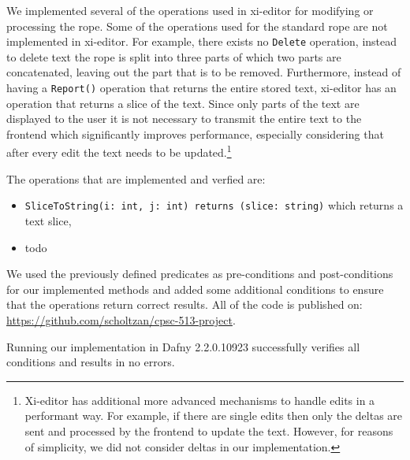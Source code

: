 We implemented several of the operations used in xi-editor for modifying or processing the rope.
Some of the operations used for the standard rope are not implemented in xi-editor. 
For example, there exists no \texttt{Delete} operation, instead to delete text the rope is split into three parts of which two parts are concatenated, leaving out the part that is to be removed.
Furthermore, instead of having a \texttt{Report()} operation that returns the entire stored text, xi-editor has an operation that returns a slice of the text.
Since only parts of the text are displayed to the user it is not necessary to transmit the entire text to the frontend which significantly improves performance, especially considering that after every edit the text needs to be updated.\footnote{Xi-editor has additional more advanced mechanisms to handle edits in a performant way. For example, if there are single edits then only the deltas are sent and processed by the frontend to update the text. However, for reasons of simplicity, we did not consider deltas in our implementation.}

The operations that are implemented and verfied are:
\begin{itemize} 
  \item \texttt{SliceToString(i: int, j: int) returns (slice: string)} which returns a text slice,
  \item todo
\end{itemize}


We used the previously defined predicates as pre-conditions and post-conditions for our implemented methods and added some additional conditions to ensure that the operations return correct results.
All of the code is published on: \url{https://github.com/scholtzan/cpsc-513-project}.

Running our implementation in Dafny 2.2.0.10923 successfully verifies all conditions and results in no errors.


  